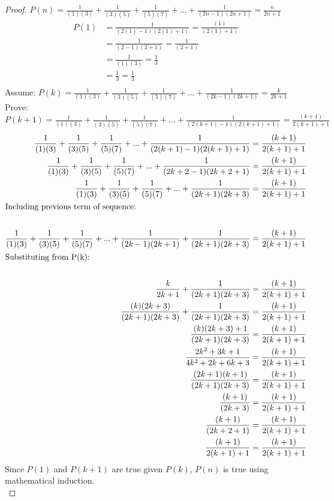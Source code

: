 \documentclass[a4paper]{article}
\begin{document}
\begin{proof} 
$P(n) =\frac{1}{(1)(3)} + \frac{1}{(3)(5)} + \frac{1}{(5)(7)} + ... +\frac{1}{(2n-1)(2n+1)} = \frac{n}{2n+1} $\\
\begin{align*}
P(1) &= \frac{1}{(2(1)-1)(2(1)+1)} = \frac{(1)}{(2(1)+1)} \\
&= \frac{1}{(2-1)(2+1)} = \frac{1}{(2+1)}\\
&=\frac{1}{(1)(3)} = \frac{1}{3}\\
&= \frac{1}{3} = \frac{1}{3}\\
\end{align*}
Assume: $P(k) = \frac{1}{(1)(3)} + \frac{1}{(3)(5)} + \frac{1}{(5)(7)} + ... +\frac{1}{(2k-1)(2k+1)} = \frac{k}{2k+1} $\\
Prove: $P(k+1) = \frac{1}{(1)(3)} + \frac{1}{(3)(5)} + \frac{1}{(5)(7)} + ... +\frac{1}{(2(k+1)-1)(2(k+1)+1)} = \frac{(k+1)}{2(k+1)+1} $\\
\begin{align*}
\frac{1}{(1)(3)} + \frac{1}{(3)(5)} + \frac{1}{(5)(7)} + ... +\frac{1}{(2(k+1)-1)(2(k+1)+1)} &= \frac{(k+1)}{2(k+1)+1}\\
\frac{1}{(1)(3)} + \frac{1}{(3)(5)} + \frac{1}{(5)(7)} + ... +\frac{1}{(2k+2-1)(2k+2+1)} &= \frac{(k+1)}{2(k+1)+1}\\
\frac{1}{(1)(3)} + \frac{1}{(3)(5)} + \frac{1}{(5)(7)} + ... +\frac{1}{(2k+1)(2k+3)} &= \frac{(k+1)}{2(k+1)+1}\\
\intertext{Including previous term of sequence:}\\
\frac{1}{(1)(3)} + \frac{1}{(3)(5)} + \frac{1}{(5)(7)} + ... +\frac{1}{(2k-1)(2k+1)}+\frac{1}{(2k+1)(2k+3)} &= \frac{(k+1)}{2(k+1)+1} \\
\intertext{Substituting from P(k):}\\
\frac{k}{2k+1} + \frac{1}{(2k+1)(2k+3)} &= \frac{(k+1)}{2(k+1)+1} \\
\frac{(k)(2k+3)}{(2k+1)(2k+3)} + \frac{1}{(2k+1)(2k+3)} &= \frac{(k+1)}{2(k+1)+1}\\
\frac{(k)(2k+3) + 1}{(2k+1)(2k+3)} &= \frac{(k+1)}{2(k+1)+1}\\
\frac{2k^2 +3k +1}{4k^2 + 2k + 6k + 3} &= \frac{(k+1)}{2(k+1)+1}\\
\frac{(2k+1)(k+1)}{(2k+1)(2k+3)}&= \frac{(k+1)}{2(k+1)+1}\\
\frac{(k+1)}{(2k+3)}&= \frac{(k+1)}{2(k+1)+1}\\
\frac{(k+1)}{(2k+2 +1)} &= \frac{(k+1)}{2(k+1)+1}\\
\frac{(k+1)}{2(k+1) +1} &= \frac{(k+1)}{2(k+1)+1}\\
\end{align*}
Since $P(1)$ and $P(k+1)$ are true given $P(k)$, $P(n)$ is true using mathematical induction. \\
\end{proof}
\end{document}
